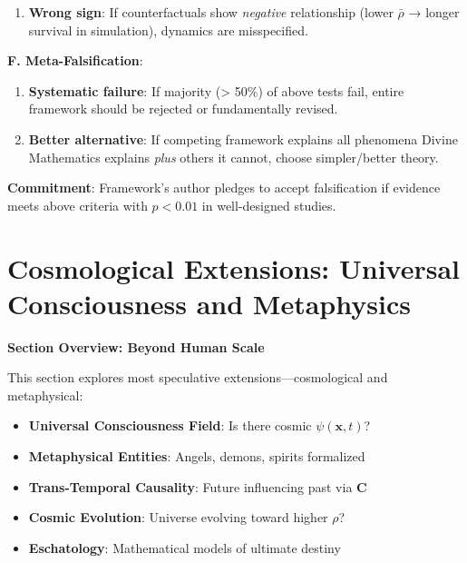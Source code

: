 \documentclass[11pt,a4paper]{article}
\theoremstyle{definition}
\theoremstyle{remark}
\begin{document}
\begin{enumerate}
\begin{mdframed}[backgroundcolor=red!10,linewidth=2pt,linecolor=red!70!black]
\begin{enumerate}
    \item \textbf{Wrong sign}: If counterfactuals show \textit{negative} relationship (lower \(\bar{\rho}\) → longer survival in simulation), dynamics are misspecified.
\end{enumerate}

\textbf{F. Meta-Falsification}:
\begin{enumerate}
    \item \textbf{Systematic failure}: If majority (> 50\%) of above tests fail, entire framework should be rejected or fundamentally revised.
    
    \item \textbf{Better alternative}: If competing framework explains all phenomena Divine Mathematics explains \textit{plus} others it cannot, choose simpler/better theory.
\end{enumerate}

\textbf{Commitment}: Framework's author pledges to accept falsification if evidence meets above criteria with \(p < 0.01\) in well-designed studies.
\end{mdframed}


\section{Cosmological Extensions: Universal Consciousness and Metaphysics}

\begin{mdframed}[backgroundcolor=cyan!5,linewidth=2pt]
\textbf{Section Overview: Beyond Human Scale}

This section explores most speculative extensions—cosmological and metaphysical:

\begin{itemize}[nosep]
    \item \textbf{Universal Consciousness Field}: Is there cosmic \(\psi(\mathbf{x}, t)\)?
    \item \textbf{Metaphysical Entities}: Angels, demons, spirits formalized
    \item \textbf{Trans-Temporal Causality}: Future influencing past via \(\mathbf{C}\)
    \item \textbf{Cosmic Evolution}: Universe evolving toward higher \(\rho\)?
    \item \textbf{Eschatology}: Mathematical models of ultimate destiny
\end{itemize}


\end{mdframed}
\end{enumerate}
\end{document}
